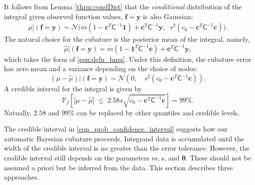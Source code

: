 \documentclass{iitthesis}          %
\newcommand{\bm}[1]{\boldsymbol{#1}}
\newcommand{\vtheta}{{\bm{\theta}}}
\newcommand{\vc}{\bm{c}}
\newcommand{\vf}{\bm{f}}
\newcommand{\vy}{\bm{y}}
\newcommand{\vone}{\bm{1}}
\newcommand{\mC}{\mathsf{C}}
\newcommand{\calN}{\mathcal{N}}
\newcommand{\hmu}{\widehat{\mu}}
\begin{document}
It follows from Lemma \ref{thrm:condDist} that the \emph{conditional} distribution of the integral given observed function values, $\vf = \vy$ is also Gaussian:
\begin{align} \label{eqn:condInteg}
\mu | (\vf = \vy) \sim \calN \bigl(m (1 - \vc^T \mC^{-1} \vone)  + \vc^T \mC^{-1} \vy, \;\;
s^2(c_0  -\vc ^T \mC^{-1} \vc) \bigr).
\end{align}
The natural choice for  the cubature is the posterior mean of the integral, namely, 
\begin{equation}
\label{eqn:BayesCub}
\widehat{\mu}  \vert ( \vf = \vy)
= m(1 - \vone^T  \mC^{-1}\vc )
+ \vc^T \mC^{-1} \vy,
\end{equation}
which takes the form of \eqref{eqn:defn_hmu}.
Under this definition, the cubature error has zero mean and a variance depending on the choice of nodes:
\begin{equation*}
(\mu-\hmu) | (\vf = \vy)
 \sim  \calN 
\left(
0, \quad
s^2 (c_0 - \vc^T\mC^{-1}\vc) 
\right).
\end{equation*}
A credible interval for the integral is given by 
\begin{equation}
\label{eqn_prob_confidence_interval}
\mathbb{P}_f \left[
|\mu-\hmu| \; \leq \; 2.58 s \sqrt{c_0 - \vc^T\mC^{-1}\vc } 
\right] = 99\%.
\end{equation}
Natually, $2.58$ and $99\%$ can be replaced by other quantiles and credible levels.


\label{sec:stopping_criteria}

The credible interval in \eqref{eqn_prob_confidence_interval} suggests how our automatic Bayesian cubature proceeds.  Integrand data is accumulated until the width of the credible interval is no greater than the error tolerance.  However, the credible interval still depends on the parameters $m, s$, and $\vtheta$.  These should not be assumed a priori but be inferred from the data.  This section describes three approaches.
\end{document}
